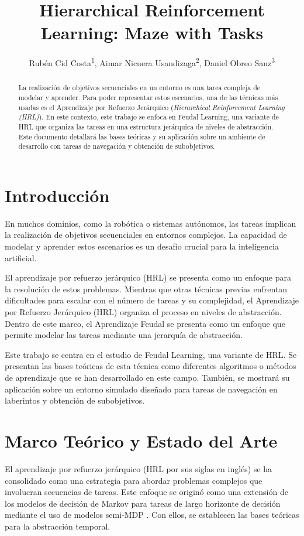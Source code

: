 \documentclass[letterpaper]{article} %
\title{Hierarchical Reinforcement Learning: Maze with Tasks}
\author {
    Rubén Cid Costa\textsuperscript{\rm 1},
    Aimar Nicuera Usandizaga\textsuperscript{\rm 2},
    Daniel Obreo Sanz\textsuperscript{\rm 3}
}
\begin{document}
\maketitle

\begin{abstract}
La realización de objetivos secuenciales en un entorno es una tarea compleja de modelar y aprender. Para poder representar estos
escenarios, una de las técnicas más usadas es el Aprendizaje por Refuerzo Jerárquico (\textit{Hierarchical Reinforcement Learning (HRL)}).
En este contexto, este trabajo se enfoca en Feudal Learning, una variante de HRL que organiza las tareas en una estructura jerárquica de
niveles de abstracción. Este documento detallará las bases teóricas y su aplicación sobre un ambiente de desarrollo con tareas de navegación y
obtención de subobjetivos.
\end{abstract}

\section{Introducción}

En muchos dominios, como la robótica o sistemas autónomos, las tareas implican la realización de objetivos secuenciales en entornos complejos.
La capacidad de modelar y aprender estos escenarios es un desafío crucial para la inteligencia artificial.

El aprendizaje por refuerzo jerárquico (HRL) se presenta como un enfoque para la resolución de estos problemas. Mientras que otras técnicas previas
enfrentan dificultades para escalar con el número de tareas y su complejidad, el Aprendizaje por Refuerzo Jerárquico (HRL) organiza el proceso en 
niveles de abstracción. Dentro de este marco, el Aprendizaje Feudal se presenta como un enfoque que permite modelar las tareas mediante una jerarquía
de abstracción.

Este trabajo se centra en el estudio de Feudal Learning, una variante de HRL. Se presentan las bases teóricas de esta técnica como diferentes algoritmos
o métodos de aprendizaje que se han desarrollado en este campo. También, se mostrará su aplicación sobre un entorno simulado diseñado para tareas 
de navegación en laberintos y obtención de subobjetivos. 

\section{Marco Teórico y Estado del Arte}
El aprendizaje por refuerzo jerárquico (HRL por sus siglas en inglés) se ha consolidado como una estrategia para abordar problemas complejos
que involucran secuencias de tareas. Este enfoque se originó como una extensión de los modelos de decisión de Markov para tareas de largo horizonte
de decisión mediante el uso de modelos semi-MDP \cite{sutton1999between}. Con ellos, se establecen las bases teóricas para la abstracción temporal.
\end{document}
